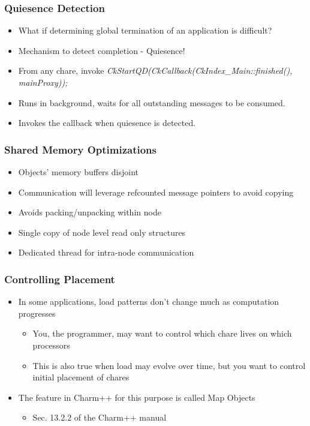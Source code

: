 \begin{frame}[fragile]
  \frametitle{Quiesence Detection}
  \begin{itemize}
    \item What if determining global termination of an application is difficult?
    \item Mechanism to detect completion - Quiesence!
    \item From any chare, invoke \emph{CkStartQD(CkCallback(CkIndex\_Main::finished(), mainProxy));}
    \item Runs in background, waits for all outstanding messages to be consumed.
    \item Invokes the callback when quiesence is detected.
  \end{itemize}
\end{frame}

\begin{frame}[fragile]
  \frametitle{Shared Memory Optimizations}
  \begin{itemize}
    \item Objects' memory buffers disjoint
    \item Communication will leverage refcounted message pointers to avoid copying
    \item Avoids packing/unpacking within node
    \item Single copy of node level read only structures
    \item Dedicated thread for intra-node communication
  \end{itemize}
\end{frame}

\begin{frame}[fragile]
  \frametitle{Controlling Placement}
  \begin{itemize}
    \item In some applications, load patterns don’t change much as computation progresses
    \begin{itemize}
      \item You, the programmer, may want to control which chare lives on which processors
      \item This is also true when  load may evolve over time, but you want to control initial placement of chares
    \end{itemize}
    \item The feature in Charm++ for this purpose is called Map Objects
    \begin{itemize}
      \item Sec. 13.2.2 of the Charm++ manual
    \end{itemize}
  \end{itemize}
\end{frame}

